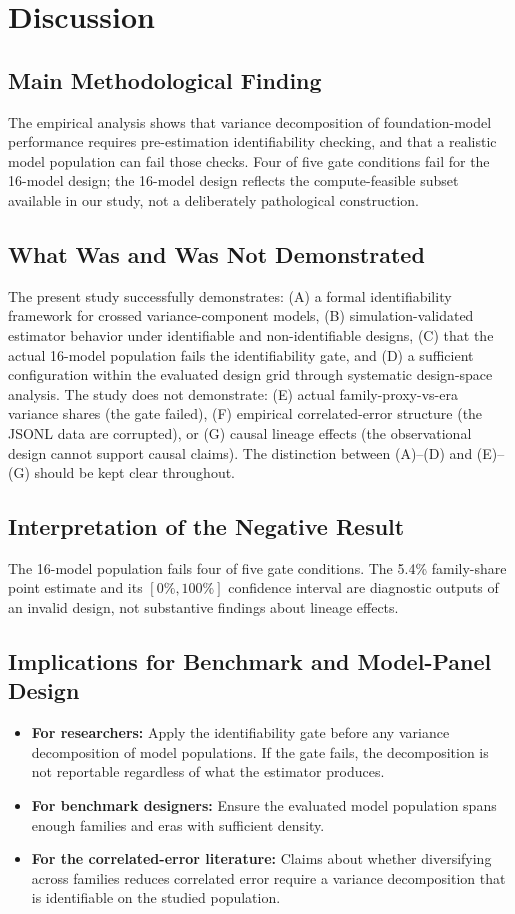 \documentclass[11pt]{article}
\theoremstyle{definition}
\theoremstyle{plain}
\begin{document}
\section{Discussion}
\label{sec:discussion}

\subsection{Main Methodological Finding}
The empirical analysis shows that variance decomposition of foundation-model performance requires pre-estimation identifiability checking, and that a realistic model population can fail those checks. Four of five gate conditions fail for the 16-model design; the 16-model design reflects the compute-feasible subset available in our study, not a deliberately pathological construction.

\subsection{What Was and Was Not Demonstrated}
The present study successfully demonstrates: (A) a formal identifiability framework for crossed variance-component models, (B) simulation-validated estimator behavior under identifiable and non-identifiable designs, (C) that the actual 16-model population fails the identifiability gate, and (D) a sufficient configuration within the evaluated design grid through systematic design-space analysis. The study does not demonstrate: (E) actual family-proxy-vs-era variance shares (the gate failed), (F) empirical correlated-error structure (the JSONL data are corrupted), or (G) causal lineage effects (the observational design cannot support causal claims). The distinction between (A)--(D) and (E)--(G) should be kept clear throughout.

\subsection{Interpretation of the Negative Result}
The 16-model population fails four of five gate conditions. The 5.4\% family-share point estimate and its $[0\%, 100\%]$ confidence interval are diagnostic outputs of an invalid design, not substantive findings about lineage effects.

\subsection{Implications for Benchmark and Model-Panel Design}
\begin{itemize}
\item \textbf{For researchers:} Apply the identifiability gate before any variance decomposition of model populations. If the gate fails, the decomposition is not reportable regardless of what the estimator produces.
\item \textbf{For benchmark designers:} Ensure the evaluated model population spans enough families and eras with sufficient density.
\item \textbf{For the correlated-error literature:} Claims about whether diversifying across families reduces correlated error require a variance decomposition that is identifiable on the studied population.
\end{itemize}
\end{document}
